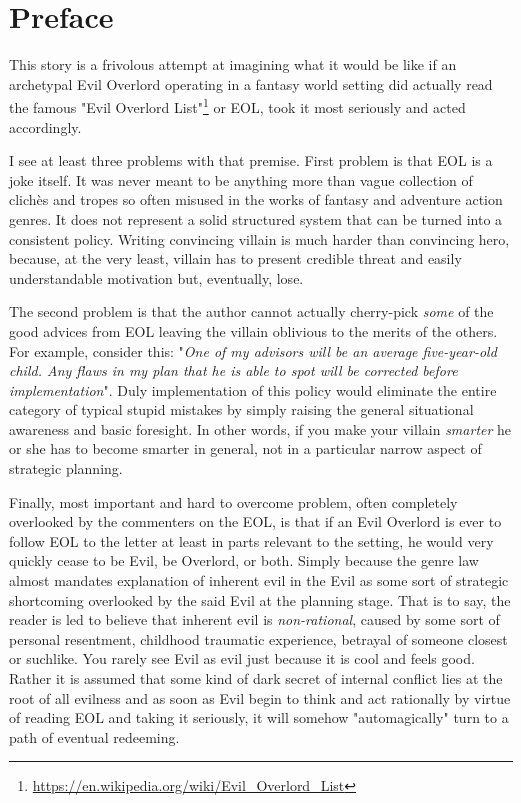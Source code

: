 \chapter*{Preface}


This story is a frivolous attempt at imagining what it would be like if an archetypal Evil Overlord operating in a fantasy world setting did actually read the famous "Evil Overlord List"\footnote{\url{https://en.wikipedia.org/wiki/Evil_Overlord_List}} or EOL, took it most seriously and acted accordingly.

I see at least three problems with that premise. First problem is that EOL is a joke itself. It was never meant to be anything more than vague collection of clich\`es and tropes so often misused in the works of fantasy and adventure action genres. It does not represent a solid structured system that can be turned into a consistent policy. Writing convincing villain is much harder than convincing hero, because, at the very least, villain has to present credible threat and easily understandable motivation but, eventually, lose.

The second problem is that the author cannot actually cherry-pick \textit{some} of the good advices from EOL leaving the villain oblivious to the merits of the others. For example, consider this: "\textit{One of my advisors will be an average five-year-old child. Any flaws in my plan that he is able to spot will be corrected before implementation}". Duly implementation of this policy would eliminate the entire category of typical stupid mistakes by simply raising the general situational awareness and basic foresight. In other words, if you make your villain \textit{smarter} he or she has to become smarter in general, not in a particular narrow aspect of strategic planning.

Finally, most important and hard to overcome problem, often completely overlooked by the commenters on the EOL, is that if an Evil Overlord is ever to follow EOL to the letter at least in parts relevant to the setting, he would very quickly cease to be Evil, be Overlord, or both. Simply because the genre law almost mandates explanation of inherent evil in the Evil as some sort of strategic shortcoming overlooked by the said Evil at the planning stage. That is to say, the reader is led to believe that inherent evil is \textit{non-rational}, caused by some sort of personal resentment, childhood traumatic experience, betrayal of someone closest or suchlike. You rarely see Evil as evil just because it is cool and feels good. Rather it is assumed that some kind of dark secret of internal conflict lies at the root of all evilness and as soon as Evil begin to think and act rationally by virtue of reading EOL and taking it seriously, it will somehow "automagically" turn to a path of eventual redeeming.

